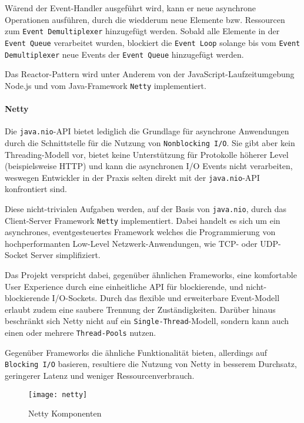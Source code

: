 Wärend der Event-Handler ausgeführt wird, kann er neue asynchrone Operationen ausführen, durch die wiedderum
neue Elemente bzw. Ressourcen zum \verb|Event Demultiplexer| hinzugefügt werden.
Sobald alle Elemente in der \verb|Event Queue| verarbeitet wurden, blockiert die \verb|Event Loop| solange
bis vom \verb|Event Demultiplexer| neue Events der \verb|Event Queue| hinzugefügt werden. \parencite{SchmidtReactorPattern}

Das Reactor-Pattern wird unter Anderem von der JavaScript-Laufzeitumgebung Node.js und vom Java-Framework \verb|Netty| implementiert.

\paragraph{Netty}

Die \verb|java.nio|-API bietet lediglich die Grundlage für asynchrone Anwendungen
durch die Schnittstelle für die Nutzung von \verb|Nonblocking I/O|.
Sie gibt aber kein Threading-Modell vor, bietet keine Unterstützung für Protokolle höherer Level (beispielsweise HTTP) und
kann die asynchronen I/O Events nicht verarbeiten, weswegen Entwickler in der Praxis selten direkt mit der \verb|java.nio|-API
konfrontiert sind.

Diese nicht-trivialen Aufgaben werden, auf der Basis von \verb|java.nio|, durch das Client-Server Framework \verb|Netty| implementiert.
Dabei handelt es sich um ein asynchrones, eventgesteuertes Framework welches
die Programmierung von hochperformanten Low-Level Netzwerk-Anwendungen, wie TCP- oder UDP-Socket Server simplifiziert. \parencite{NettyUserAction}

Das Projekt verspricht dabei, gegenüber ähnlichen Frameworks, eine komfortable User Experience durch eine einheitliche API für
blockierende, und nicht-blockierende I/O-Sockets. Durch das flexible und erweiterbare Event-Modell erlaubt zudem eine saubere Trennung der Zuständigkeiten.
Darüber hinaus beschränkt sich Netty nicht auf ein \verb|Single-Thread|-Modell, sondern kann auch einen oder mehrere \verb|Thread-Pools| nutzen.

Gegenüber Frameworks die ähnliche Funktionalität bieten, allerdings auf \verb|Blocking I/O| basieren, resultiere die Nutzung von Netty
in besserem Durchsatz, geringerer Latenz und weniger Ressourcenverbrauch. \parencite{Netty}

\begin{figure}[h!]
	\centering
	\texttt{[image: netty]}
	\caption{Netty Komponenten \parencite{Netty}}
	\label{fig:netty}
\end{figure}